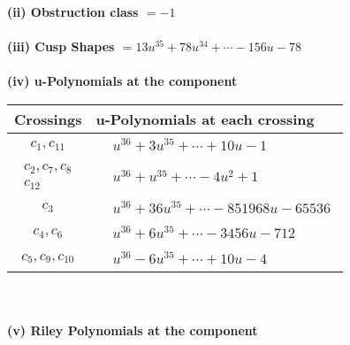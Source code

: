 \documentclass[1p]{elsarticle_modified}
\theoremstyle{definition}
\begin{document}
\flushleft \textbf{(ii) Obstruction class $= -1$}\\~\\
\flushleft \textbf{(iii) Cusp Shapes $= 13 u^{35}+78 u^{34}+\cdots-156 u-78$}\\~\\
\newpage\renewcommand{\arraystretch}{1}
\flushleft \textbf{(iv) u-Polynomials at the component}\newline \\
\begin{tabular}{m{50pt}|m{274pt}}
Crossings & \hspace{64pt}u-Polynomials at each crossing \\
\hline $$\begin{aligned}c_{1},c_{11}\end{aligned}$$&$\begin{aligned}
&u^{36}+3 u^{35}+\cdots+10 u-1
\end{aligned}$\\
\hline $$\begin{aligned}c_{2},c_{7},c_{8}\\c_{12}\end{aligned}$$&$\begin{aligned}
&u^{36}+u^{35}+\cdots-4 u^2+1
\end{aligned}$\\
\hline $$\begin{aligned}c_{3}\end{aligned}$$&$\begin{aligned}
&u^{36}+36 u^{35}+\cdots-851968 u-65536
\end{aligned}$\\
\hline $$\begin{aligned}c_{4},c_{6}\end{aligned}$$&$\begin{aligned}
&u^{36}+6 u^{35}+\cdots-3456 u-712
\end{aligned}$\\
\hline $$\begin{aligned}c_{5},c_{9},c_{10}\end{aligned}$$&$\begin{aligned}
&u^{36}-6 u^{35}+\cdots+10 u-4
\end{aligned}$\\
\hline
\end{tabular}\\~\\
\newpage\renewcommand{\arraystretch}{1}
\flushleft \textbf{(v) Riley Polynomials at the component}\newline \\
\end{document}
